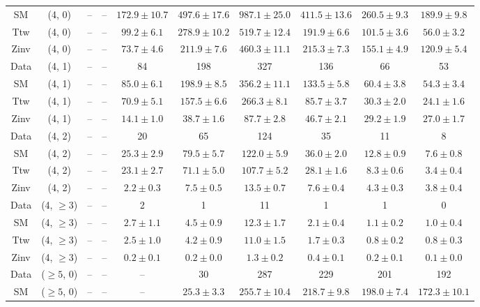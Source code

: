 \begin{table}[h!]
{\begin{tabular}{cccccccccc}
	SM & (4, 0) & -- & -- & $172.9\pm 10.7$ & $497.6\pm 17.6$ & $987.1\pm 25.0$ & $411.5\pm 13.6$ & $260.5\pm 9.3$ & $189.9\pm 9.8$ \\[0.5ex] 
	Ttw & (4, 0) & -- & -- & $99.2\pm 6.1$ & $278.9\pm 10.2$ & $519.7\pm 12.4$ & $191.9\pm 6.6$ & $101.5\pm 3.6$ & $56.0\pm 3.2$ \\[0.5ex] 
	Zinv & (4, 0) & -- & -- & $73.7\pm 4.6$ & $211.9\pm 7.6$ & $460.3\pm 11.1$ & $215.3\pm 7.3$ & $155.1\pm 4.9$ & $120.9\pm 5.4$ \\[0.5ex] 
	Data & (4, 1) & -- & -- & 84 & 198 & 327 & 136 & 66 & 53 \\[0.5ex] 
	SM & (4, 1) & -- & -- & $85.0\pm 6.1$ & $198.9\pm 8.5$ & $356.2\pm 11.1$ & $133.5\pm 5.8$ & $60.4\pm 3.8$ & $54.3\pm 3.4$ \\[0.5ex] 
	Ttw & (4, 1) & -- & -- & $70.9\pm 5.1$ & $157.5\pm 6.6$ & $266.3\pm 8.1$ & $85.7\pm 3.7$ & $30.3\pm 2.0$ & $24.1\pm 1.6$ \\[0.5ex] 
	Zinv & (4, 1) & -- & -- & $14.1\pm 1.0$ & $38.7\pm 1.6$ & $87.7\pm 2.8$ & $46.7\pm 2.1$ & $29.2\pm 1.9$ & $27.0\pm 1.7$ \\[0.5ex] 
	Data & (4, 2) & -- & -- & 20 & 65 & 124 & 35 & 11 & 8 \\[0.5ex] 
	SM & (4, 2) & -- & -- & $25.3\pm 2.9$ & $79.5\pm 5.7$ & $122.0\pm 5.9$ & $36.0\pm 2.0$ & $12.8\pm 0.9$ & $7.6\pm 0.8$ \\[0.5ex] 
	Ttw & (4, 2) & -- & -- & $23.1\pm 2.7$ & $71.1\pm 5.0$ & $107.7\pm 5.2$ & $28.1\pm 1.6$ & $8.3\pm 0.6$ & $3.4\pm 0.4$ \\[0.5ex] 
	Zinv & (4, 2) & -- & -- & $2.2\pm 0.3$ & $7.5\pm 0.5$ & $13.5\pm 0.7$ & $7.6\pm 0.4$ & $4.3\pm 0.3$ & $3.8\pm 0.4$ \\[0.5ex] 
	Data & (4, $\ge3$) & -- & -- & 2 & 1 & 11 & 1 & 1 & 0 \\[0.5ex] 
	SM & (4, $\ge3$) & -- & -- & $2.7\pm 1.1$ & $4.5\pm 0.9$ & $12.3\pm 1.7$ & $2.1\pm 0.4$ & $1.1\pm 0.2$ & $1.0\pm 0.4$ \\[0.5ex] 
	Ttw & (4, $\ge3$) & -- & -- & $2.5\pm 1.0$ & $4.2\pm 0.9$ & $11.0\pm 1.5$ & $1.7\pm 0.3$ & $0.8\pm 0.2$ & $0.8\pm 0.3$ \\[0.5ex] 
	Zinv & (4, $\ge3$) & -- & -- & $0.2\pm 0.1$ & $0.2\pm 0.0$ & $1.3\pm 0.2$ & $0.4\pm 0.1$ & $0.2\pm 0.1$ & $0.1\pm 0.0$ \\[0.5ex] 
	Data & ($\ge5$, 0) & -- & -- & -- & 30 & 287 & 229 & 201 & 192 \\[0.5ex] 
	SM & ($\ge5$, 0) & -- & -- & -- & $25.3\pm 3.3$ & $255.7\pm 10.4$ & $218.7\pm 9.8$ & $198.0\pm 7.4$ & $172.3\pm 10.1$ \\[0.5ex] 

\end{tabular}}
\end{table}

